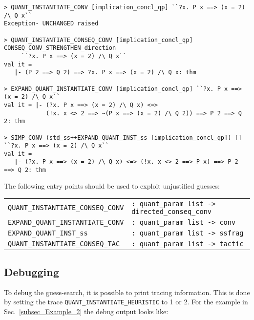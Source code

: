 \documentclass[a4paper,12pt,DIV=12,oneside]{scrbook}
\theoremstyle{definition}
\theoremstyle{remark}
\begin{document}
{\scriptsize
\begin{verbatim}
> QUANT_INSTANTIATE_CONV [implication_concl_qp] ``?x. P x ==> (x = 2) /\ Q x``
Exception- UNCHANGED raised

> QUANT_INSTANTIATE_CONSEQ_CONV [implication_concl_qp] CONSEQ_CONV_STRENGTHEN_direction
     ``?x. P x ==> (x = 2) /\ Q x``
val it =
   |- (P 2 ==> Q 2) ==> ?x. P x ==> (x = 2) /\ Q x: thm

> EXPAND_QUANT_INSTANTIATE_CONV [implication_concl_qp] ``?x. P x ==> (x = 2) /\ Q x``
val it = |- (?x. P x ==> (x = 2) /\ Q x) <=>
            (!x. x <> 2 ==> ~(P x ==> (x = 2) /\ Q 2)) ==> P 2 ==> Q 2: thm

> SIMP_CONV (std_ss++EXPAND_QUANT_INST_ss [implication_concl_qp]) [] ``?x. P x ==> (x = 2) /\ Q x``
val it =
   |- (?x. P x ==> (x = 2) /\ Q x) <=> (!x. x <> 2 ==> P x) ==> P 2 ==> Q 2: thm
\end{verbatim}}


The following entry points should be used to exploit unjustified guesses:
\bigskip

\noindent
\begin{tabular}{@{}ll}
\texttt{QUANT\_INSTANTIATE\_CONSEQ\_CONV} & \texttt{: quant\_param list -> directed\_conseq\_conv} \\
\texttt{EXPAND\_QUANT\_INSTANTIATE\_CONV} & \texttt{: quant\_param list -> conv} \\
\texttt{EXPAND\_QUANT\_INST\_ss} & \texttt{: quant\_param list -> ssfrag} \\
\texttt{QUANT\_INSTANTIATE\_CONSEQ\_TAC} & \texttt{: quant\_param list -> tactic}
\end{tabular}

\subsection{Debugging}

To debug the guess-search, it is possible to print tracing information.
This is done by setting the trace \texttt{QUANT\_INSTANTIATE\_HEURISTIC} to 1 or 2. For
the example in Sec.~\ref{subsec_Example_2} the debug output looks like:
\end{document}
